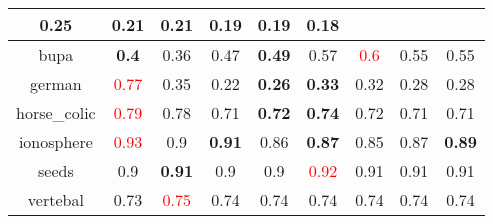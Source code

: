 \documentclass{article}%
\begin{document}
\begin{tabular}{c|cccccccc}
{0.25
}&0.21&\textbf{0.21}&0.19&\textbf{0.19}&0.18\\%
\hline%
bupa&\textbf{0.4}&0.36&0.47&\textbf{0.49}&0.57&\textcolor{red}{ 
0.6
}&0.55&0.55\\%
\hline%
german&\textcolor{red}{ 
0.77
}&0.35&0.22&\textbf{0.26}&\textbf{0.33}&0.32&0.28&0.28\\%
\hline%
horse\_colic&\textcolor{red}{ 
0.79
}&0.78&0.71&\textbf{0.72}&\textbf{0.74}&0.72&0.71&0.71\\%
\hline%
ionosphere&\textcolor{red}{ 
0.93
}&0.9&\textbf{0.91}&0.86&\textbf{0.87}&0.85&0.87&\textbf{0.89}\\%
\hline%
seeds&0.9&\textbf{0.91}&0.9&0.9&\textcolor{red}{ 
0.92
}&0.91&0.91&0.91\\%
\hline%
vertebal&0.73&\textcolor{red}{ 
0.75
}&0.74&0.74&0.74&0.74&0.74&0.74\\%
\hline%
\end{tabular}

%
\end{document}
